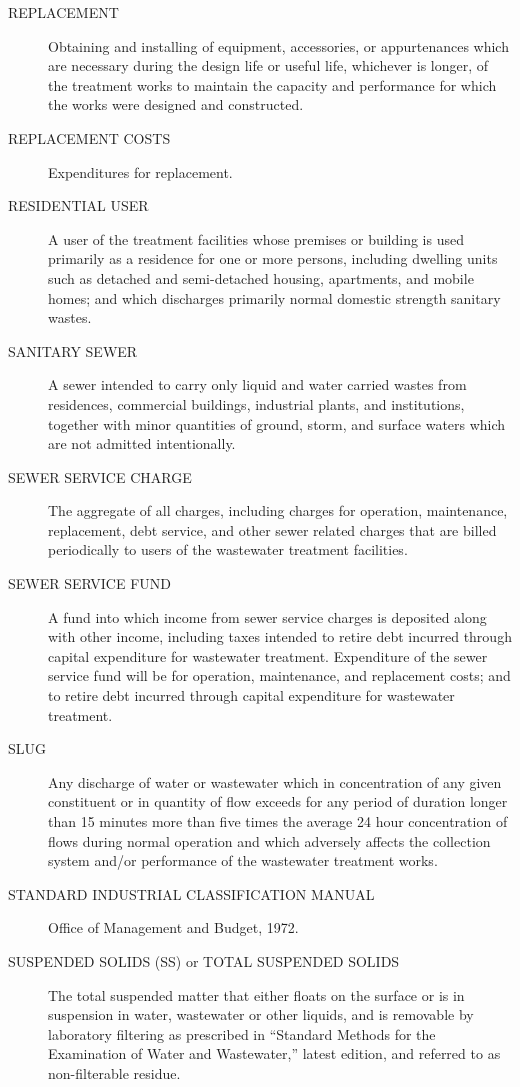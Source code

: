 \begin{description}
\item[REPLACEMENT] Obtaining and installing of equipment, accessories, or appurtenances which are necessary during the design life or useful life, whichever is longer, of the treatment works to maintain the capacity and performance for which the works were designed and constructed.
\item[REPLACEMENT COSTS] Expenditures for replacement.
\item[RESIDENTIAL USER] A user of the treatment facilities whose premises or building is used primarily as a residence for one or more persons, including dwelling units such as detached and semi-detached housing, apartments, and mobile homes; and which discharges primarily normal domestic strength sanitary wastes.
\item[SANITARY SEWER] A sewer intended to carry only liquid and water carried wastes from residences, commercial buildings, industrial plants, and institutions, together with minor quantities of ground, storm, and surface waters which are not admitted intentionally.
\item[SEWER SERVICE CHARGE] The aggregate of all charges, including charges for operation, maintenance, replacement, debt service, and other sewer related charges that are billed periodically to users of the wastewater treatment facilities.
\item[SEWER SERVICE FUND] A fund into which income from sewer service charges is deposited along with other income, including taxes intended to retire debt incurred through capital expenditure for wastewater treatment.  Expenditure of the sewer service fund will be for operation, maintenance, and replacement costs; and to retire debt incurred through capital expenditure for wastewater treatment.
\item[SLUG] Any discharge of water or wastewater which in concentration of any given constituent or in quantity of flow exceeds for any period of duration longer than 15 minutes more than five times the average 24 hour concentration of flows during normal operation and which adversely affects the collection system and/or performance of the wastewater treatment works.
\item[STANDARD INDUSTRIAL CLASSIFICATION MANUAL] Office of Management and Budget, 1972.
\item[SUSPENDED SOLIDS (SS) or TOTAL SUSPENDED SOLIDS] The total suspended matter that either floats on the surface or is in suspension in water, wastewater or other liquids, and is removable by laboratory filtering as prescribed in “Standard Methods for the Examination of Water and Wastewater,” latest edition, and referred to as non-filterable residue.

\end{description}
